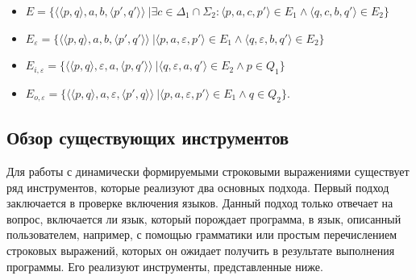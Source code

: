 \begin{itemize}
\item $E = \{ \langle \langle p, q \rangle, a, b, \langle p', q' \rangle \rangle\ | \exists c \in \Delta_1 \cap \Sigma_2 : \langle p, a, c, p' \rangle \in E_1 \wedge \langle q, c, b, q' \rangle \in E_2\}$
\item $E_{\varepsilon} = \{ \langle \langle p, q \rangle, a, b, \langle p', q' \rangle \rangle\ | \langle p, a, {\varepsilon}, p' \rangle \in E_1 \wedge \langle q, {\varepsilon}, b, q' \rangle \in E_2\}$
\item $E_{i, \varepsilon} = \{ \langle \langle p, q \rangle, {\varepsilon}, a, \langle p, q' \rangle \rangle\ | \langle q, {\varepsilon}, a, q' \rangle \in E_2 \wedge p \in Q_1 \} $
\item $E_{o, \varepsilon} = \{ \langle \langle p, q \rangle,  a, {\varepsilon}, \langle p', q \rangle \rangle\ | \langle p, a, {\varepsilon}, p' \rangle \in E_1 \wedge q \in Q_2 \}. $
\end{itemize}


\subsection{Обзор существующих инструментов}

Для работы с динамически формируемыми строковыми выражениями существует ряд инструментов, которые реализуют два основных подхода. Первый подход заключается в проверке включения языков. Данный подход только отвечает на вопрос, включается ли язык, который порождает программа, в язык, описанный пользователем, например, с помощью грамматики или простым перечислением строковых выражений, которых он ожидает получить в результате выполнения программы. Его реализуют инструменты, представленные ниже.

